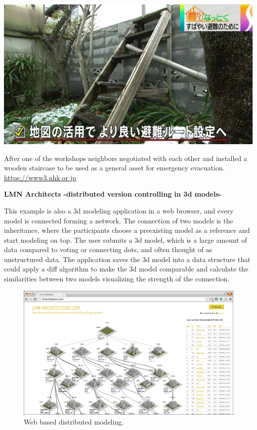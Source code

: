 \begin{marginfigure}[{0cm}]
  \includegraphics[width=\textwidth]{chapters/3/fig/nhk_kamakura.jpg}               
  \caption[collective collaboration]{After one of the workshops neighbors
  negotiated with each other and installed a wooden staircase to be used as
a general asset for emergency evacuation. \url{https://www3.nhk.or.jp}}
  \label{fig:nigechizu}
\end{marginfigure}


\textbf{LMN Architects -distributed version controlling in 3d
models-}

This example is also a 3d modeling application in a web browser, and every model is connected forming a network. The connection of two models is the inheritance, where the participants choose a preexisting model as a reference and start modeling on top.  The user submits a 3d model, which is a large amount of data compared to voting or connecting dots, and often thought of as unstructured data. The application saves the 3d model into a data structure that could apply a diff algorithm to make the 3d model comparable and calculate the similarities between two models visualizing the strength of the connection.

\begin{figure}[htb]
  \includegraphics[width=\textwidth]{chapters/3/fig/lmn_004.png}               
  \caption[LMN:web based distributed modelling]{Web based distributed modeling.}
  \label{fig:lnm}
\end{figure}

